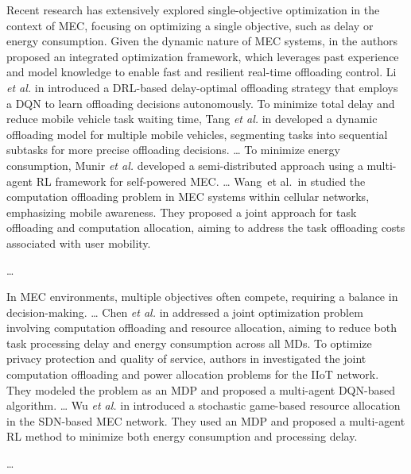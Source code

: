 \documentclass[12pt,draftclsnofoot,onecolumn]{IEEEtran}
\newenvironment{my}[2]%
{\begin{list}{}%
{\setlength{\rightmargin}{#1}\setlength{\leftmargin}{#2}}%


 \item[]{}

} {\end{list}}
\begin{document}
\begin{enumerate}
\begin{my}{1cm}{1cm}
{{	Recent research has extensively explored single-objective optimization in the context of MEC, focusing on optimizing a single objective, such as delay or energy consumption. 
    Given the dynamic nature of MEC systems, in \cite{li2022integrated} the authors proposed an integrated optimization framework, which leverages past experience and model knowledge to enable fast and resilient real-time offloading control. Li \textit{et al.} in \cite{li2020joint} introduced a DRL-based delay-optimal offloading strategy that employs a DQN to learn offloading decisions autonomously. 
	To minimize total delay and reduce mobile vehicle task waiting time, Tang \textit{et al.} in \cite{tang2022double} developed a dynamic offloading model for multiple mobile vehicles, segmenting tasks into sequential subtasks for more precise offloading decisions.
	\dots
	To minimize energy consumption, Munir \textit{et al.} \cite{munir2021multi} developed a semi-distributed approach using a multi-agent RL framework for self-powered MEC. 
	\dots
	Wang et al. in \cite{wang2020reinforcement} studied the computation offloading problem in MEC systems within cellular networks, emphasizing mobile awareness. They proposed a joint approach for task offloading and computation allocation, aiming to address the task offloading costs associated with user mobility. 

	\dots


	In MEC environments, multiple objectives often compete, requiring a balance in decision-making. 
	\dots 
	Chen \textit{et al.} in \cite{chen2021drl} addressed a joint optimization problem involving computation offloading and resource allocation, aiming to reduce both task processing delay and energy consumption across all MDs.
	To optimize privacy protection and quality of service, authors in \cite{wu2024privacy} investigated the joint computation offloading and power allocation problems for the IIoT network. They modeled the problem as an MDP and proposed a multi-agent DQN-based algorithm. 
    \dots
	Wu \textit{et al.} in \cite{wu2023computation} introduced a stochastic game-based resource allocation in the SDN-based MEC network. They used an MDP and proposed a multi-agent RL method to minimize both energy consumption and processing delay. 

	\dots
	
}}
\end{my}
\end{enumerate}
\end{document}

